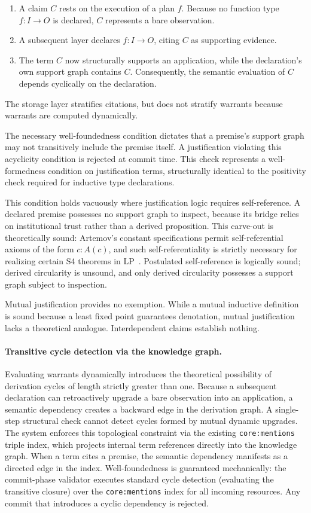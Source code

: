\documentclass[manuscript,nonacm=true]{acmart}
\newcommand{\code}[1]{\texttt{\small #1}}
\begin{document}
\begin{enumerate}
\item A claim $C$ rests on the execution of a plan $f$. Because no function type $f : I \to O$ is declared, $C$ represents a bare observation.
\item A subsequent layer declares $f : I \to O$, citing $C$ as supporting evidence.
\item The term $C$ now structurally supports an application, while the declaration's own support graph contains $C$. Consequently, the semantic evaluation of $C$ depends cyclically on the declaration.
\end{enumerate}

The storage layer stratifies citations, but does not stratify warrants because warrants are computed dynamically.

The necessary well-foundedness condition dictates that a premise's support graph may not transitively include the premise itself. A justification violating this acyclicity condition is rejected at commit time. This check represents a well-formedness condition on justification terms, structurally identical to the positivity check required for inductive type declarations.

This condition holds vacuously where justification logic requires self-reference. A declared premise possesses no support graph to inspect, because its bridge relies on institutional trust rather than a derived proposition. This carve-out is theoretically sound: Artemov's constant specifications permit self-referential axioms of the form $c : A(c)$, and such self-referentiality is strictly necessary for realizing certain S4 theorems in LP~\cite{af19}. Postulated self-reference is logically sound; derived circularity is unsound, and only derived circularity possesses a support graph subject to inspection.

Mutual justification provides no exemption. While a mutual inductive definition is sound because a least fixed point guarantees denotation, mutual justification lacks a theoretical analogue. Interdependent claims establish nothing.

\paragraph{Transitive cycle detection via the knowledge graph.} Evaluating warrants dynamically introduces the theoretical possibility of derivation cycles of length strictly greater than one. Because a subsequent declaration can retroactively upgrade a bare observation into an application, a semantic dependency creates a backward edge in the derivation graph. A single-step structural check cannot detect cycles formed by mutual dynamic upgrades. The system enforces this topological constraint via the existing \code{core:mentions} triple index, which projects internal term references directly into the knowledge graph. When a term cites a premise, the semantic dependency manifests as a directed edge in the index. Well-foundedness is guaranteed mechanically: the commit-phase validator executes standard cycle detection (evaluating the transitive closure) over the \code{core:mentions} index for all incoming resources. Any commit that introduces a cyclic dependency is rejected.
\end{document}
